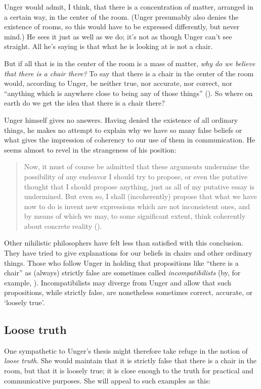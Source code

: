 \documentclass[11pt]{standalone} \newif\ifstandlone \standalonetrue
\newenvironment{squote}{%
	\begin{quote}\begin{singlespace}%
	}{%
	\end{singlespace}\end{quote}}
\begin{document}
\begin{spacing}{1.5}
Unger would admit, I think, that there is a concentration of matter,
arranged in a certain way, in the center of the room.  (Unger
presumably also denies the existence of rooms, so this would have to
be expressed differently, but never mind.)  He sees it just as well
as we do; it's not as though Unger can't see straight.  All he's
saying is that what he is looking at is not a chair.

But if all that is in the center of the room is a mass of matter, {\em
  why do we believe that there is a chair there?}  To say that there
is a chair in the center of the room would, according to Unger, be
neither true, nor accurate, nor correct, nor ``anything which is
anywhere close to being any of those things''
(\citeyear[148]{unger1979}).  So where on earth do we get the idea
that there is a chair there?

Unger himself gives no answers.  Having denied the existence of all
ordinary things, he makes no attempt to explain why we have so many
false beliefs or what gives the impression of coherency to our use of
them in communication.  He seems almost to revel in the strangeness of
his position:

\begin{squote}
Now, it must of course be admitted that these arguments
undermine the possibility of any endeavor I should try to propose, or
even the putative thought that I should propose anything, just as all
of my putative essay is undermined.  But even so, I shall
(incoherently) propose that what we have now to do is invent new
expressions which are not inconsistent ones, and by means of which we
may, to some significant extent, think coherently about concrete
reality (\citeyear[544]{unger1980b}).
\end{squote}
Other nihilistic philosophers have felt less than satisfied with this
conclusion.  They have tried to give explanations for our beliefs in
chairs and other ordinary things.  Those who follow Unger in holding
that propositions like ``there is a chair'' as (always) strictly false
are sometimes called {\em incompatibilists} (by, for example,
\citet{korman2009}).  Incompatibilists may diverge from Unger and
allow that such propositions, while strictly false, are nonetheless
sometimes correct, accurate, or `loosely true'.

\subsection{Loose truth}
\label{loose-u}
One sympathetic to Unger's thesis might therefore take refuge in the
notion of {\em loose truth}.  She would maintain that it is strictly
false that there is a chair in the room, but that it is loosely true;
it is close enough to the truth for practical and communicative
purposes.  She will appeal to such examples as this:


\end{spacing}
\end{document}
